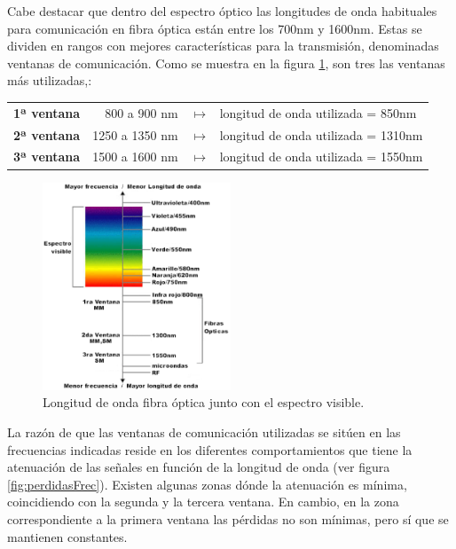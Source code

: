 	Cabe destacar que dentro del espectro óptico las longitudes de onda habituales para comunicación en fibra óptica están entre los 700nm y 1600nm. Estas se dividen en rangos con mejores características para la transmisión, denominadas ventanas de comunicación. Como se muestra en la figura \ref{fig:ventanaOptica}, son tres las ventanas más utilizadas,\cite{ventanasFO}:
 	\begin{table}[H]
		\hspace{2cm}
		\renewcommand{\arraystretch}{2}
		\begin{tabular}{rrl}
			\textbf{1ª ventana}& 800 a  900 nm  & $\longmapsto$ $\,$ longitud de onda utilizada = 850nm  \\
			\textbf{2ª ventana}& 1250 a 1350 nm & $\longmapsto$ $\,$ longitud de onda utilizada = 1310nm  \\
			\textbf{3ª ventana}& 1500 a 1600 nm & $\longmapsto$ $\,$ longitud de onda utilizada = 1550nm   \\ 
		\end{tabular} 
	\end{table}

	 \begin{figure}[H]
	 	\centering
	 	\includegraphics[width=0.5\textwidth]{./img/ventana}
	 	\caption{Longitud de onda fibra óptica junto con el espectro visible. \cite{ventanasFO}}
	 	\label{fig:ventanaOptica}
	 \end{figure}
 	La razón de que las ventanas de comunicación utilizadas se sitúen en las frecuencias indicadas reside en los diferentes comportamientos que tiene la atenuación de las señales en función de la longitud de onda (ver figura \ref{fig:perdidasFrec}). Existen algunas zonas dónde la atenuación es mínima, coincidiendo con la segunda y la tercera ventana. En cambio, en la zona correspondiente a la primera ventana las pérdidas no son mínimas, pero sí que se mantienen constantes. 	
 	

